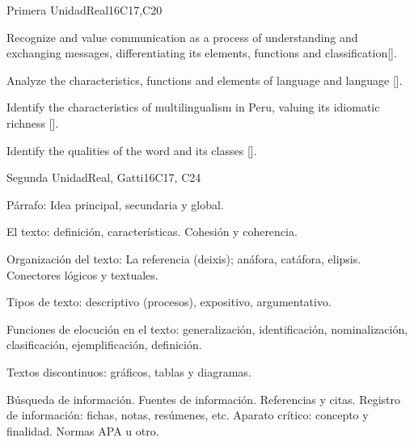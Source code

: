 \begin{syllabus}
\begin{unit}{}{Primera Unidad}{Real}{16}{C17,C20}
\begin{learningoutcomes}
   \item Recognize and value communication as a process of understanding and exchanging messages, differentiating its elements, functions and classification[\Usage].
   \item Analyze the characteristics, functions and elements of language and language [\Usage].
   \item Identify the characteristics of multilingualism in Peru, valuing its idiomatic richness [\Usage].
   \item Identify the qualities of the word and its classes [\Usage].
\end{learningoutcomes}
\end{unit}

\begin{unit}{}{Segunda Unidad}{Real, Gatti}{16}{C17, C24}
\begin{topics}
   \item Párrafo: Idea principal, secundaria y global.
   \item El texto: definición, características. Cohesión y coherencia.
   \item Organización del texto: La referencia (deixis); anáfora, catáfora, elipsis. Conectores lógicos y textuales.
   \item Tipos de texto: descriptivo (procesos), expositivo, argumentativo.
   \item Funciones de elocución en el texto: generalización, identificación, nominalización, clasificación,  ejemplificación, definición.
   \item Textos discontinuos: gráficos, tablas y diagramas.
   \item Búsqueda de información. Fuentes de información. Referencias y citas. Registro de información: fichas, notas, resúmenes, etc. Aparato crítico: concepto y finalidad. Normas APA u otro.


\end{topics}
\end{unit}
\end{syllabus}
